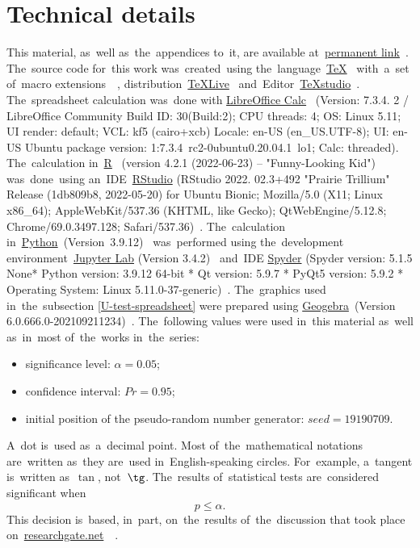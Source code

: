 \documentclass[]{scrreprt}
\begin{document}
%
\tableofcontents
\listoftables
\listoffigures
\lstlistoflistings
%	
\chapter{Technical details}
This material, as~well as~the~appendices to~it, are available at~\href{https://github.com/Kirill-Murashev/AI_for_valuers_book/tree/main/Parts-Chapters/Mann-Whitney-Wilcoxon}{permanent link}~\cite{Murashev:u-test}. The~source code for~this work was~created~using the~language~\href{https://www.ctan.org/}{\TeX}~\cite{TeX:site} with~a~set of~macro extensions~\href{https://www latex-project.org/}{\LaTeXe}~\cite{LaTeX:site}, distribution~\href{https://www.tug.org/texlive/}{TeXLive}~\cite{TeXLive:site} and~Editor~\href{https://www.texstudio.org/}{TeXstudio}~\cite{TeXstudio:site}. The~spreadsheet calculation was~done with \href{https://www.libreoffice.org/discover/calc/}{LibreOffice Calc}~\cite{LO:Calc} (Version: 7.3.4. 2 / LibreOffice Community Build ID: 30(Build:2); CPU threads: 4; OS: Linux 5.11; UI render: default; VCL: kf5 (cairo+xcb) Locale: en-US (en\_US.UTF-8); UI: en-US Ubuntu package version: 1:7.3.4~rc2-0ubuntu0.20.04.1~lo1; Calc: threaded). The~calculation in~\href{https://www.r-project.org/}{R}~\cite{R_language} (version 4.2.1 (2022-06-23) -- "Funny-Looking Kid") was~done~using an~IDE~\href{https://www.rstudio.com/}{RStudio} (RStudio 2022. 02.3+492 "Prairie Trillium" Release (1db809b8, 2022-05-20) for Ubuntu Bionic; Mozilla/5.0 (X11; Linux x86\_64); AppleWebKit/537.36 (KHTML, like Gecko); QtWebEngine/5.12.8; Chrome/69.0.3497.128; Safari/537.36)~\cite{RStudio:official_site}. The~calculation in~\href{https://www.python.org/}{Python}~(Version~3.9.12)~\cite{Python:site} was~performed using the~development environment~\href{https://jupyter.org}{Jupyter Lab} (Version 3.4.2)~\cite{Jupyter:site} and~IDE \href{https://www.spyder-ide.org/}{Spyder} (Spyder version: 5.1.5 None* Python version: 3.9.12 64-bit * Qt version: 5.9.7 * PyQt5 version: 5.9.2
* Operating System: Linux 5.11.0-37-generic)~\cite{Spyder:site}. The~graphics used in~the~subsection \ref{U-test-spreadsheet} were prepared using \href{Geogebra:official-site}{Geogebra}~(Version 6.0.666.0-202109211234)~\cite{Geogebra:official-site}. The~following values were used in~this material as~well as~in~most of~the~works in~the~series:
\begin{itemize}
	\item significance level: $\alpha = 0.05$;
	\item confidence interval: $Pr = 0.95$;
	\item initial position of the pseudo-random number generator: $seed=19190709$.
\end{itemize}
A~dot is~used as~a~decimal point. Most of~the~mathematical notations are~written as~they are~used in~English-speaking circles. For~example, a~tangent is~written as~$\tan$, not~$\tg$. The~results of~statistical tests are~considered significant when
\begin{equation}\label{eq:significance}
p \leq \alpha.
\end{equation}
This decision is~based, in~part, on~the~results of~the~discussion that took place on~\href{researchgate.net}{researchgate.net}~~\cite{RG:p-equals-alpha}.
%
\end{document}

